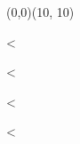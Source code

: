 \documentclass{report}
\begin{document}
\begin{VCPicture}{(0,0)(10, 10)}
  
  <%
 
  <%
  
  <%

  <%
  
\end{VCPicture}
\end{document}
